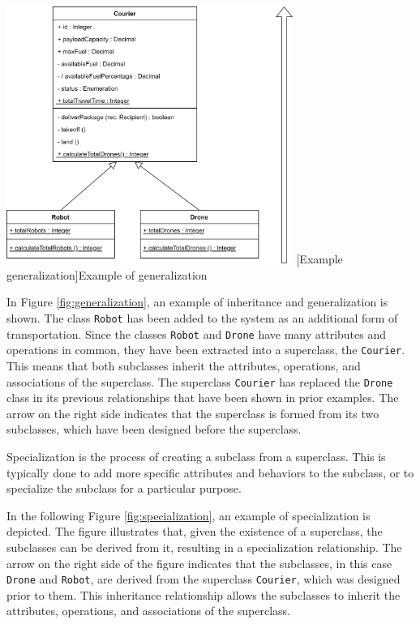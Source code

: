 \documentclass[
	12pt,
    a4paper,
    egregdoesnotlikesansseriftitles, %
    toc=chapterentrywithdots,
    oneside, openany,
    titlepage,
    parskip=half,
    headings=normal,  %
    listof=totoc,
    bibliography=totocnumbered,
    index=totoc,
    captions=tableheading,  %
    listof=flat,
    numbers=noenddot, %
    final]
    {scrbook}
\begin{document}
\vspace{1em}
\begin{minipage}{\linewidth}
	\centering
	\includegraphics[width=0.7\textwidth]{figures/inheritance/generalization.jpg}
	[Example generalization]{Example of generalization}
	\label{fig:generalization}
\end{minipage}

In Figure \ref{fig:generalization}, an example of inheritance and generalization is shown. 
The class \texttt{Robot} has been added to the system as an additional form of transportation. 
Since the classes \texttt{Robot} and \texttt{Drone} have many attributes and operations in common, they have been extracted into a superclass, the \texttt{Courier}.
This means that both subclasses inherit the attributes, operations, and associations of the superclass. 
The superclass \texttt{Courier} has replaced the \texttt{Drone} class in its previous relationships that have been shown in prior examples.
The arrow on the right side indicates that the superclass is formed from its two subclasses, which have been designed before the superclass.



Specialization is the process of creating a subclass from a superclass. This is typically done to add more specific attributes and behaviors to the subclass, or to specialize the subclass for a particular purpose.

In the following Figure \ref{fig:specialization}, an example of specialization is depicted. The figure illustrates that, given the existence of a superclass, the subclasses can be derived from it, resulting in a specialization relationship. 
The arrow on the right side of the figure indicates that the subclasses, in this case \texttt{Drone} and \texttt{Robot}, are derived from the superclass \texttt{Courier}, which was designed prior to them. 
This inheritance relationship allows the subclasses to inherit the attributes, operations, and associations of the superclass.
\end{document}
